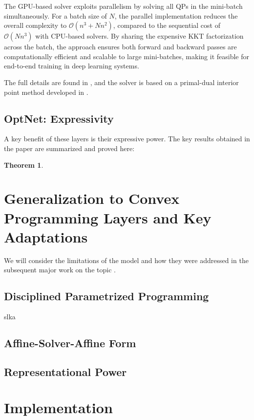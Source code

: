 \documentclass{article}
\newtheorem{theorem}{Theorem}
\begin{document}
The GPU-based solver exploits parallelism by solving all QPs in the mini-batch simultaneously. For a batch size of \( N \), the parallel implementation reduces the overall complexity to \( \mathcal{O}(n^3 + N n^2) \), compared to the sequential cost of \( \mathcal{O}(N n^3) \) with CPU-based solvers. By sharing the expensive KKT factorization across the batch, the approach ensures both forward and backward passes are computationally efficient and scalable to large mini-batches, making it feasible for end-to-end training in deep learning systems.

 The full details are found in \citep{optnet}, and the solver is based on a primal-dual interior point method developed in \citep{mattingley2012cvxgen}.

\subsection{OptNet: Expressivity}

A key benefit of these layers is their expressive power. The key results obtained in the paper are summarized and proved here:

\begin{theorem}
    
\end{theorem}

\section{Generalization to Convex Programming Layers and Key Adaptations}

We will consider the limitations of the model and how they were addressed in the subsequent major work on the topic \citep{differentiableconvexoptimizationlayers}.
    \subsection{Disciplined Parametrized Programming}
    slka
    \subsection{Affine-Solver-Affine Form}
\subsection{Representational Power}

\section{Implementation}
\end{document}
